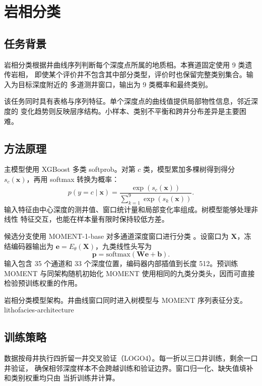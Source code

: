 \chapter{岩相分类}

\section{任务背景}

岩相分类根据井曲线序列判断每个深度点所属的地质相。本赛道固定使用 9 类遗传岩相，
即使某个评价井不包含其中部分类型，评价时也保留完整类别集合。输入为目标深度附近的
多道测井窗口，输出为 9 类概率和最终类别。

该任务同时具有表格与序列特征。单个深度点的曲线值提供局部物性信息，邻近深度的
变化趋势则反映层序结构。小样本、类别不平衡和跨井分布差异是主要困难。

\section{方法原理}

主模型使用 XGBoost 多类 softprob。对第 $c$ 类，模型累加多棵树得到得分
$s_c(\bm{x})$，再用 softmax 转换为概率：
\begin{equation}
  p(y=c\mid\bm{x})
  =\frac{\exp(s_c(\bm{x}))}{\sum_{k=1}^{9}\exp(s_k(\bm{x}))}.
\end{equation}
输入特征由中心深度的测井值、窗口统计量和局部变化率组成。树模型能够处理非线性
特征交互，也能在样本量有限时保持较低方差。

候选分支使用 MOMENT-1-base 对多通道深度窗口进行分类
\cite{goswami2024moment}。设窗口为 $\bm{X}$，冻结编码器输出为
$\bm{e}=E_{\theta}(\bm{X})$，九类线性头写为
\begin{equation}
  \bm{p}=\mathrm{softmax}(\bm{W}\bm{e}+\bm{b}).
\end{equation}
输入包含 35 个通道和 33 个深度位置，编码器内部插值到长度 512。预训练 MOMENT
与同架构随机初始化 MOMENT 使用相同的九类分类头，因而可直接检验预训练权重的作用。

  {岩相分类模型架构。井曲线窗口同时进入树模型与 MOMENT 序列表征分支。}
  {lithofacies-architecture}

\section{训练策略}

数据按母井执行四折留一井交叉验证（LOGO4）。每一折以三口井训练，剩余一口井验证，
确保相邻深度样本不会跨越训练和验证边界。窗口归一化、缺失值填补和类别权重均只由
当折训练井计算。


